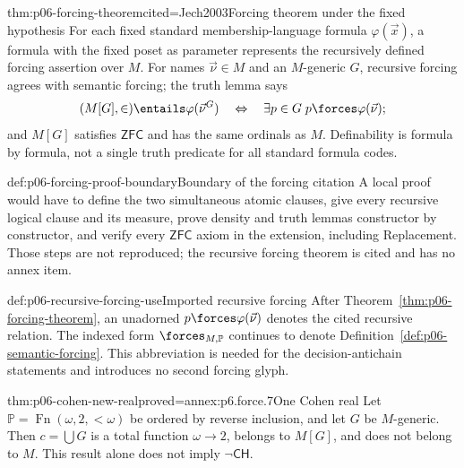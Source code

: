 \begin{hbtheorem}{thm:p06-forcing-theorem}{cited=Jech2003}{Forcing theorem under the fixed hypothesis}
For each fixed standard membership-language formula \(\varphi(\vec x)\), a
formula with the fixed poset as parameter represents the recursively defined
forcing assertion over \(M\).  For names \(\vec\nu\in M\) and an
\(M\)-generic \(G\), recursive forcing agrees with semantic forcing; the truth
lemma says
\[
  (M[G],\in)\entails\varphi(\vec\nu^G)
  \quad\Leftrightarrow\quad
  \exists p\in G\;p\forces\varphi(\vec\nu);
\]
and \(M[G]\) satisfies \(\mathsf{ZFC}\) and has the same ordinals as \(M\).
Definability is formula by formula, not a single truth predicate for all
standard formula codes.
\end{hbtheorem}

\begin{proofboundary}{def:p06-forcing-proof-boundary}{Boundary of the forcing citation}
A local proof would have to define the two simultaneous atomic clauses, give
every recursive logical clause and its measure, prove density and truth lemmas
constructor by constructor, and verify every \(\mathsf{ZFC}\) axiom in the
extension, including Replacement.  Those steps are not reproduced; the
recursive forcing theorem is cited and has no annex item.
\end{proofboundary}

\begin{hbconvention}{def:p06-recursive-forcing-use}{Imported recursive forcing}
After Theorem~\ref{thm:p06-forcing-theorem}, an unadorned
\(p\forces\varphi(\vec\nu)\) denotes the cited recursive relation.  The
indexed form \(\forces_{M,\mathbb P}\) continues to denote
Definition~\ref{def:p06-semantic-forcing}.  This abbreviation is needed for
the decision-antichain statements and introduces no second forcing glyph.
\end{hbconvention}

\begin{hbtheorem}{thm:p06-cohen-new-real}{proved=annex:p6.force.7}{One Cohen real}
Let
\(\mathbb P=\operatorname{Fn}(\omega,2,{<}\omega)\)
be ordered by reverse inclusion, and let \(G\) be \(M\)-generic.  Then
\(c=\bigcup G\) is a total function \(\omega\to2\), belongs to \(M[G]\), and
does not belong to \(M\).  This result alone does not imply
\(\neg\mathsf{CH}\).
\end{hbtheorem}

